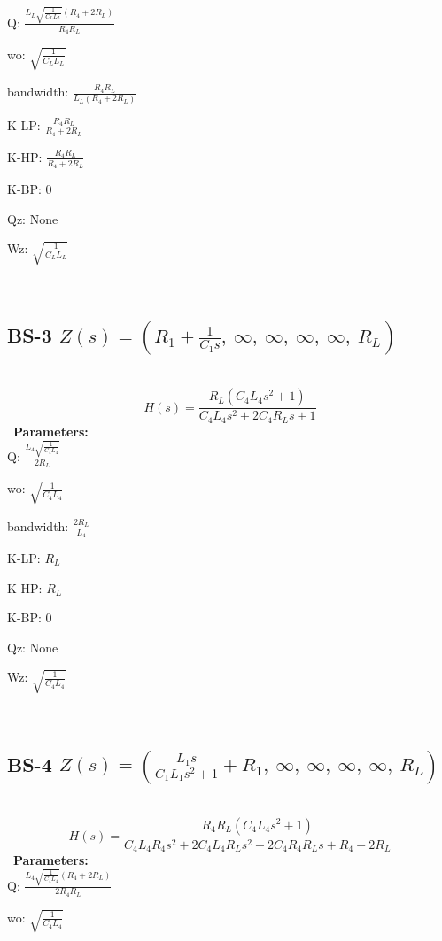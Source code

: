 \documentclass{article}
\begin{document}
Q: $\frac{L_{L} \sqrt{\frac{1}{C_{L} L_{L}}} \left(R_{4} + 2 R_{L}\right)}{R_{4} R_{L}}$\ 

wo: $\sqrt{\frac{1}{C_{L} L_{L}}}$\ 

bandwidth: $\frac{R_{4} R_{L}}{L_{L} \left(R_{4} + 2 R_{L}\right)}$\ 

K-LP: $\frac{R_{4} R_{L}}{R_{4} + 2 R_{L}}$\ 

K-HP: $\frac{R_{4} R_{L}}{R_{4} + 2 R_{L}}$\ 

K-BP: $0$\ 

Qz: $\text{None}$\ 

Wz: $\sqrt{\frac{1}{C_{L} L_{L}}}$\ 

\ 

\subsection{BS-3 $Z(s) = \left( R_{1} + \frac{1}{C_{1} s}, \  \infty, \  \infty, \  \infty, \  \infty, \  R_{L}\right)$ } \ 
\textbf{\[H(s) = \frac{R_{L} \left(C_{4} L_{4} s^{2} + 1\right)}{C_{4} L_{4} s^{2} + 2 C_{4} R_{L} s + 1}\] } \ 
\textbf{Parameters:}\\ 

Q: $\frac{L_{4} \sqrt{\frac{1}{C_{4} L_{4}}}}{2 R_{L}}$\ 

wo: $\sqrt{\frac{1}{C_{4} L_{4}}}$\ 

bandwidth: $\frac{2 R_{L}}{L_{4}}$\ 

K-LP: $R_{L}$\ 

K-HP: $R_{L}$\ 

K-BP: $0$\ 

Qz: $\text{None}$\ 

Wz: $\sqrt{\frac{1}{C_{4} L_{4}}}$\ 

\ 

\subsection{BS-4 $Z(s) = \left( \frac{L_{1} s}{C_{1} L_{1} s^{2} + 1} + R_{1}, \  \infty, \  \infty, \  \infty, \  \infty, \  R_{L}\right)$ } \ 
\textbf{\[H(s) = \frac{R_{4} R_{L} \left(C_{4} L_{4} s^{2} + 1\right)}{C_{4} L_{4} R_{4} s^{2} + 2 C_{4} L_{4} R_{L} s^{2} + 2 C_{4} R_{4} R_{L} s + R_{4} + 2 R_{L}}\] } \ 
\textbf{Parameters:}\\ 

Q: $\frac{L_{4} \sqrt{\frac{1}{C_{4} L_{4}}} \left(R_{4} + 2 R_{L}\right)}{2 R_{4} R_{L}}$\ 

wo: $\sqrt{\frac{1}{C_{4} L_{4}}}$\ 
\end{document}
